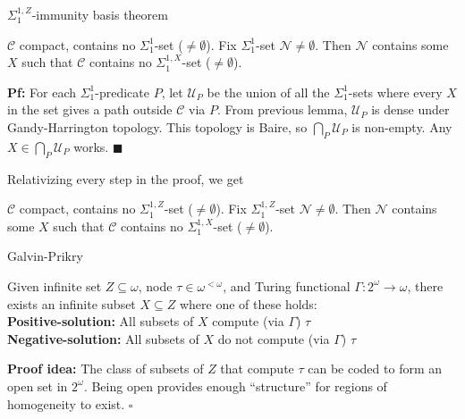 \begin{frame}{$\Sigma_1^{1,Z}$-immunity basis theorem}
  \begin{thm}
    $\mathcal{C}$ compact, contains no $\Sigma_1^{1}$-set
    ($\neq\emptyset$). Fix $\Sigma_1^{1}$-set
    $\mathcal{N}\neq\emptyset$. Then $\mathcal{N}$ contains some $X$ such
    that $\mathcal{C}$ contains no $\Sigma_1^{1,X}$-set ($\neq\emptyset$).
  \end{thm}
  \textbf{Pf:} For each $\Sigma_1^{1}$-predicate $P$, let $\mathcal{U}_P$
  be the union of all the $\Sigma_1^{1}$-sets where every $X$ in the set
  gives a path outside $\mathcal{C}$ via $P$. From previous lemma,
  $\mathcal{U}_P$ is dense under Gandy-Harrington topology. This topology
  is Baire, so $\bigcap_P\mathcal{U}_P$ is non-empty. Any
  $X\in\bigcap_P\mathcal{U}_P$ works. $\blacksquare$

  \vspace{1em}
  Relativizing every step in the proof, we get
  \begin{coro}
    $\mathcal{C}$ compact, contains no $\Sigma_1^{1,Z}$-set
    ($\neq\emptyset$). Fix $\Sigma_1^{1,Z}$-set
    $\mathcal{N}\neq\emptyset$. Then $\mathcal{N}$ contains some $X$ such
    that $\mathcal{C}$ contains no $\Sigma_1^{1,X}$-set ($\neq\emptyset$).
  \end{coro}
\end{frame}

\begin{frame}{Galvin-Prikry}
  \begin{fact*}
    Given infinite set $Z\subseteq\omega$, node $\tau\in\omega^{<\omega}$,
    and Turing functional $\Gamma:2^\omega\rightarrow\omega$, there exists
    an infinite subset $X\subseteq Z$ where one of these holds:\\
    \textbf{Positive-solution:} All subsets of $X$ compute (via $\Gamma$)
    $\tau$ \\
    \textbf{Negative-solution:} All subsets of $X$ do not compute (via
    $\Gamma$) $\tau$
  \end{fact*}

  \vspace{1em}
  \textbf{Proof idea:} The class of subsets of $Z$ that
  compute $\tau$ can be coded to form an open set in $2^\omega$. Being
  open provides enough ``structure'' for regions of homogeneity to exist.
  $\square$
\end{frame}


